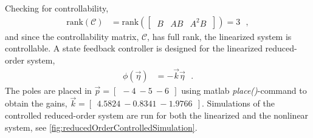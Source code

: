 %
Checking for controllability,
\begin{align}
  \mathrm{rank}(\mathcal{C}) &= \mathrm{rank}([\ \begin{matrix} B & AB & A^2 B \end{matrix}\ ]) = 3  \ \ \ ,
\end{align}
and since the controllability matrix, $\mathcal{C}$, has full rank, the linearized system is controllable.
%
A state feedback controller is designed for the linearized reduced-order system,
\begin{align}
\phi(\vec{\eta}) &=   - \vec{k} \vec{\eta}  \ \ \ .
\end{align}
%
The poles are placed in $\vec{p} = [\ \ -4 \ -5 \ -6\ \ ]$ using matlab \textit{place()}-command to obtain the gains, $\vec{k} =  [\ \ 4.5824 \ -0.8341 \ -1.9766 \ \ ]$. Simulations of the controlled reduced-order system are run for both the linearized and the nonlinear system, see \autoref{fig:reducedOrderControlledSimulation}.
%
